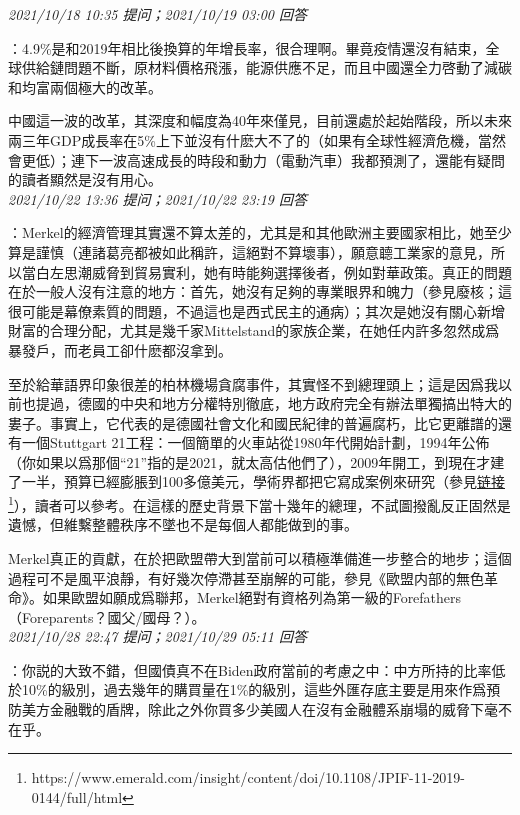 \documentclass[twocolumn]{ctexart}
\begin{document}
\textit{\hfill\noindent\small 2021/10/18 10:35 提问；2021/10/19 03:00 回答}

：4.9\%是和2019年相比後換算的年增長率，很合理啊。畢竟疫情還沒有結束，全球供給鏈問題不斷，原材料價格飛漲，能源供應不足，而且中國還全力啓動了減碳和均富兩個極大的改革。

中國這一波的改革，其深度和幅度為40年來僅見，目前還處於起始階段，所以未來兩三年GDP成長率在5\%上下並沒有什麽大不了的（如果有全球性經濟危機，當然會更低）；連下一波高速成長的時段和動力（電動汽車）我都預測了，還能有疑問的讀者顯然是沒有用心。
\\

\textit{\hfill\noindent\small 2021/10/22 13:36 提问；2021/10/22 23:19 回答}

：Merkel的經濟管理其實還不算太差的，尤其是和其他歐洲主要國家相比，她至少算是謹慎（連諸葛亮都被如此稱許，這絕對不算壞事），願意聼工業家的意見，所以當白左思潮威脅到貿易實利，她有時能夠選擇後者，例如對華政策。真正的問題在於一般人沒有注意的地方：首先，她沒有足夠的專業眼界和魄力（參見廢核；這很可能是幕僚素質的問題，不過這也是西式民主的通病）；其次是她沒有關心新增財富的合理分配，尤其是幾千家Mittelstand的家族企業，在她任内許多忽然成爲暴發戶，而老員工卻什麽都沒拿到。

至於給華語界印象很差的柏林機場貪腐事件，其實怪不到總理頭上；這是因爲我以前也提過，德國的中央和地方分權特別徹底，地方政府完全有辦法單獨搞出特大的婁子。事實上，它代表的是德國社會文化和國民紀律的普遍腐朽，比它更離譜的還有一個Stuttgart 21工程：一個簡單的火車站從1980年代開始計劃，1994年公佈（你如果以爲那個“21”指的是2021，就太高估他們了），2009年開工，到現在才建了一半，預算已經膨脹到100多億美元，學術界都把它寫成案例來研究（參見\href{https://www.emerald.com/insight/content/doi/10.1108/JPIF-11-2019-0144/full/html}{链接\footnote{\url{https://www.emerald.com/insight/content/doi/10.1108/JPIF-11-2019-0144/full/html}}}），讀者可以參考。在這樣的歷史背景下當十幾年的總理，不試圖撥亂反正固然是遺憾，但維繫整體秩序不墜也不是每個人都能做到的事。

Merkel真正的貢獻，在於把歐盟帶大到當前可以積極準備進一步整合的地步；這個過程可不是風平浪靜，有好幾次停滯甚至崩解的可能，參見《歐盟内部的無色革命》。如果歐盟如願成爲聯邦，Merkel絕對有資格列為第一級的Forefathers（Foreparents？國父/國母？）。
\\

\textit{\hfill\noindent\small 2021/10/28 22:47 提问；2021/10/29 05:11 回答}

：你説的大致不錯，但國債真不在Biden政府當前的考慮之中：中方所持的比率低於10\%的級別，過去幾年的購買量在1\%的級別，這些外匯存底主要是用來作爲預防美方金融戰的盾牌，除此之外你買多少美國人在沒有金融體系崩塌的威脅下毫不在乎。
\end{document}
